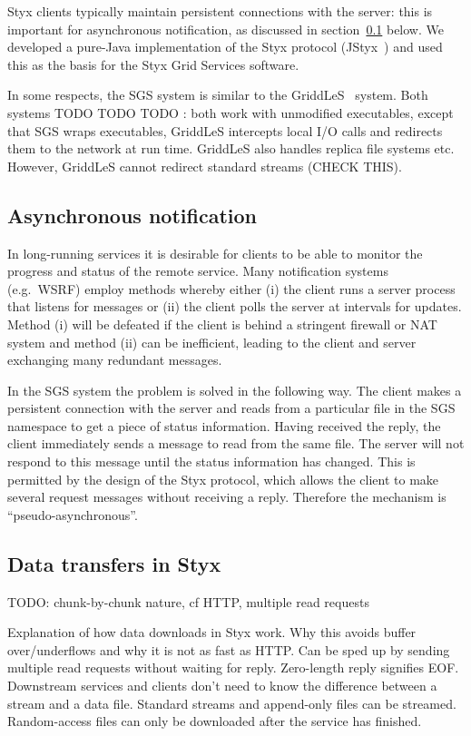 \documentclass[a4paper]{article}
\begin{document}
Styx clients typically maintain persistent connections with the server: this is important for asynchronous notification, as discussed in section~\ref{sec:notification} below.  We developed a pure-Java implementation of the Styx protocol (JStyx~\cite{JStyx}) and used this as the basis for the Styx Grid Services software.

In some respects, the SGS system is similar to the GriddLeS~\cite{abramson:2004} system.  Both systems TODO TODO TODO : both work with unmodified executables, except that SGS wraps executables, GriddLeS intercepts local I/O calls and redirects them to the network at run time.  GriddLeS also handles replica file systems etc.  However, GriddLeS cannot redirect standard streams (CHECK THIS).

\subsection{Asynchronous notification}\label{sec:notification}
In long-running services it is desirable for clients to be able to monitor the progress and status of the remote service.  Many notification systems (e.g.\ WSRF) employ methods whereby either (i) the client runs a server process that listens for messages or (ii) the client polls the server at intervals for updates.  Method (i) will be defeated if the client is behind a stringent firewall or NAT system and method (ii) can be inefficient, leading to the client and server exchanging many redundant messages.

In the SGS system the problem is solved in the following way.  The client makes a persistent connection with the server and reads from a particular file in the SGS namespace to get a piece of status information.  Having received the reply, the client immediately sends a message to read from the same file.  The server will not respond to this message until the status information has changed.  This is permitted by the design of the Styx protocol, which allows the client to make several request messages without receiving a reply.  Therefore the mechanism is ``pseudo-asynchronous''.

\subsection{Data transfers in Styx}
TODO: chunk-by-chunk nature, cf HTTP, multiple read requests

Explanation of how data downloads in Styx work.  Why this avoids buffer over/underflows and why it is not as fast as HTTP.  Can be sped up by sending multiple read requests without waiting for reply.  Zero-length reply signifies EOF.  Downstream services and clients don't need to know the difference between a stream and a data file.  Standard streams and append-only files can be streamed.  Random-access files can only be downloaded after the service has finished.
\end{document}
